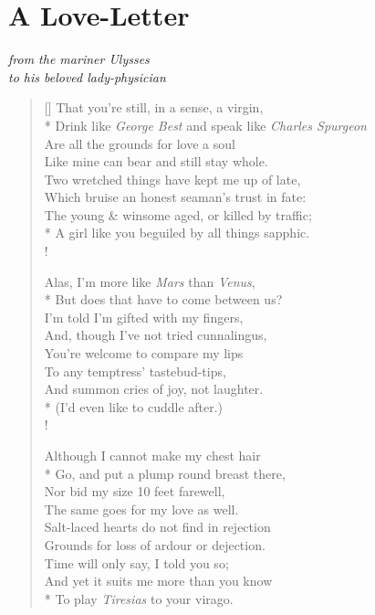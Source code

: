 \documentclass[openany]{amsbook}
\newcommand{\poeticmarginnote}[1]{\marginnote{\footnotesize #1}}
\begin{document}
\mainmatter

\chapter*{A Love-Letter}

\begin{center}
    \textit{from the mariner Ulysses}\\
    \textit{to his beloved lady-physician}\poeticmarginnote{ES}
\end{center}

\bigskip

\settowidth{\versewidth}{Like mine can bear and still stay whole.}
\begin{verse}[\versewidth]
    That you're still, in a sense, a virgin,\\*
    Drink like \textit{George Best} and speak like \textit{Charles Spurgeon}\\
    Are all the grounds for love a soul\\
    Like mine can bear and still stay whole.\\
    Two wretched things have kept me up of late,\\
    Which bruise an honest seaman's trust in fate:\\
    The young \& winsome aged, or killed by traffic;\\*
    A girl like you beguiled by all things sapphic.\\!

    Alas, I'm more like \textit{Mars} than \textit{Venus},\\*
    But does that have to come between us?\\
    I'm told I'm gifted with my fingers,\\
    And, though I've not tried cunnalingus,\\
    You're welcome to compare my lips\\
    To any temptress' tastebud-tips,\\
    And summon cries of joy, not laughter.\\*
    (I'd even like to cuddle after.)\\!

    Although I cannot make my chest hair\\*
    Go, and put a plump round breast there,\\
    Nor bid my size 10 feet farewell,\\
    The same goes for my love as well.\\
    Salt-laced hearts do not find in rejection\\
    Grounds for loss of ardour or dejection.\\
    Time will only say, I told you so;\poeticmarginnote{Auden}\\
    And yet it suits me more than you know\\*
    To play \textit{Tiresias} to your virago.
\end{verse}
\end{document}

